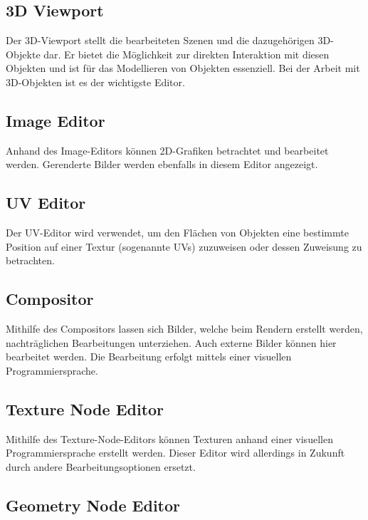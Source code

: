\documentclass[
]{book}
\let\oldmarginnote\marginnote
\renewcommand{\marginnote}[1]{%
  \oldmarginnote{{\footnotesize\selectfont #1}}%
}
\begin{document}
\subsection{3D Viewport}\label{d-viewport}

\marginnote{«General» Edito-ren}

Der 3D-Viewport stellt die bearbeiteten Szenen und die dazugehörigen
3D-Objekte dar. Er bietet die Möglichkeit zur direkten Interaktion mit
diesen Objekten und ist für das Modellieren von Objekten essenziell. Bei
der Arbeit mit 3D-Objekten ist es der wichtigste Editor.

\subsection{Image Editor}\label{image-editor}

Anhand des Image-Editors können 2D-Grafiken betrachtet und bearbeitet
werden. Gerenderte Bilder werden ebenfalls in diesem Editor angezeigt.

\subsection{UV Editor}\label{uv-editor}

Der UV-Editor wird verwendet, um den Flächen von Objekten eine bestimmte
Position auf einer Textur (sogenannte UVs) zuzuweisen oder dessen
Zuweisung zu betrachten.

\subsection{Compositor}\label{compositor}

Mithilfe des Compositors lassen sich Bilder, welche beim Rendern
erstellt werden, nachträglichen Bearbeitungen unterziehen. Auch externe
Bilder können hier bearbeitet werden. Die Bearbeitung erfolgt mittels
einer visuellen Programmiersprache.

\subsection{Texture Node Editor}\label{texture-node-editor}

Mithilfe des Texture-Node-Editors können Texturen anhand einer visuellen
Programmiersprache erstellt werden. Dieser Editor wird allerdings in
Zukunft durch andere Bearbeitungsoptionen ersetzt.

\subsection{Geometry Node Editor}\label{geometry-node-editor}
\end{document}
